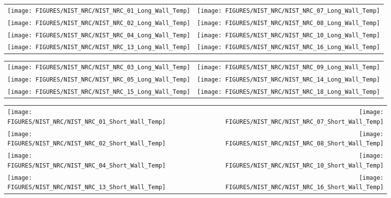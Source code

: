 \newpage

\begin{figure}[p]
\begin{tabular*}{\textwidth}{l@{\extracolsep{\fill}}r}
\texttt{[image: FIGURES/NIST\_NRC/NIST\_NRC\_01\_Long\_Wall\_Temp]} &
\texttt{[image: FIGURES/NIST\_NRC/NIST\_NRC\_07\_Long\_Wall\_Temp]} \\
\texttt{[image: FIGURES/NIST\_NRC/NIST\_NRC\_02\_Long\_Wall\_Temp]} &
\texttt{[image: FIGURES/NIST\_NRC/NIST\_NRC\_08\_Long\_Wall\_Temp]} \\
\texttt{[image: FIGURES/NIST\_NRC/NIST\_NRC\_04\_Long\_Wall\_Temp]} &
\texttt{[image: FIGURES/NIST\_NRC/NIST\_NRC\_10\_Long\_Wall\_Temp]} \\
\texttt{[image: FIGURES/NIST\_NRC/NIST\_NRC\_13\_Long\_Wall\_Temp]} &
\texttt{[image: FIGURES/NIST\_NRC/NIST\_NRC\_16\_Long\_Wall\_Temp]}
\end{tabular*}
\label{NIST_NRC_Long_Wall_Temp_Closed}
\end{figure}

\begin{figure}[p]
\begin{tabular*}{\textwidth}{l@{\extracolsep{\fill}}r}
\texttt{[image: FIGURES/NIST\_NRC/NIST\_NRC\_03\_Long\_Wall\_Temp]} &
\texttt{[image: FIGURES/NIST\_NRC/NIST\_NRC\_09\_Long\_Wall\_Temp]} \\
\texttt{[image: FIGURES/NIST\_NRC/NIST\_NRC\_05\_Long\_Wall\_Temp]} &
\texttt{[image: FIGURES/NIST\_NRC/NIST\_NRC\_14\_Long\_Wall\_Temp]} \\
\texttt{[image: FIGURES/NIST\_NRC/NIST\_NRC\_15\_Long\_Wall\_Temp]} &
\texttt{[image: FIGURES/NIST\_NRC/NIST\_NRC\_18\_Long\_Wall\_Temp]}
\end{tabular*}
\label{NIST_NRC_Long_Wall_Temp_Open}
\end{figure}

\begin{figure}[p]
\begin{tabular*}{\textwidth}{l@{\extracolsep{\fill}}r}
\texttt{[image: FIGURES/NIST\_NRC/NIST\_NRC\_01\_Short\_Wall\_Temp]} &
\texttt{[image: FIGURES/NIST\_NRC/NIST\_NRC\_07\_Short\_Wall\_Temp]} \\
\texttt{[image: FIGURES/NIST\_NRC/NIST\_NRC\_02\_Short\_Wall\_Temp]} &
\texttt{[image: FIGURES/NIST\_NRC/NIST\_NRC\_08\_Short\_Wall\_Temp]} \\
\texttt{[image: FIGURES/NIST\_NRC/NIST\_NRC\_04\_Short\_Wall\_Temp]} &
\texttt{[image: FIGURES/NIST\_NRC/NIST\_NRC\_10\_Short\_Wall\_Temp]} \\
\texttt{[image: FIGURES/NIST\_NRC/NIST\_NRC\_13\_Short\_Wall\_Temp]} &
\texttt{[image: FIGURES/NIST\_NRC/NIST\_NRC\_16\_Short\_Wall\_Temp]}
\end{tabular*}
\label{NIST_NRC_Short_Wall_Temp_Closed}
\end{figure}

